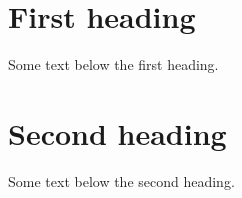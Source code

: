 \documentclass{hithesis}
\begin{document}
\section{First heading}
\ifdefined\ConsecutiveHeadings\else Some text below the first heading.\fi
\section{Second heading}
Some text below the second heading.
\end{document}
